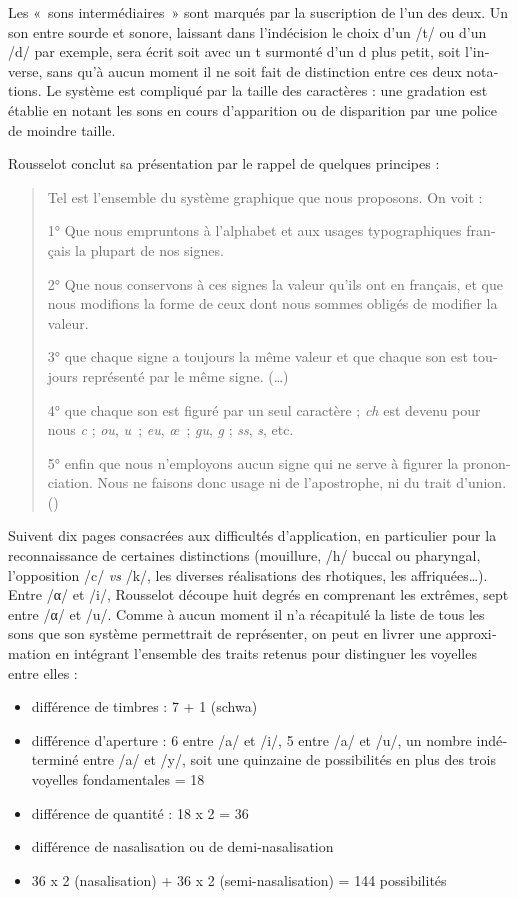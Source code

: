 \documentclass[french,output=paper,colorlinks,citecolor=brown]{../langscibook}
\begin{document}
\begin{otherlanguage}{french}
Les «~sons intermédiaires~» sont marqués par la suscription de l’un des deux. Un son entre sourde et sonore, laissant dans l’indécision le choix d’un /t/ ou d’un /d/ par exemple, sera écrit soit avec un t surmonté d’un d plus petit, soit l’inverse, sans qu’à aucun moment il ne soit fait de distinction entre ces deux notations. Le système est compliqué par la taille des caractères : une gradation est établie en notant les sons en cours d’apparition ou de disparition par une police de moindre taille.

Rousselot conclut sa présentation par le rappel de quelques principes :

\begin{quote}
    Tel est l’ensemble du système graphique que nous proposons. On voit :

    1° Que nous empruntons à l’alphabet et aux usages typographiques français la plupart de nos signes.

    2° Que nous conservons à ces signes la valeur qu’ils ont en français, et que nous modifions la forme de ceux dont nous sommes obligés de modifier la valeur.

    3° que chaque signe a toujours la même valeur et que chaque son est toujours représenté par le même signe. (…)

    4° que chaque son est figuré par un seul caractère ; \textit{ch} est devenu pour nous \textit{c} ; \textit{ou}, \textit{u~}; \textit{eu}, \textit{œ~}; \textit{gu}, \textit{g} ; \textit{ss}, \textit{s}, etc.

    5° enfin que nous n’employons aucun signe qui ne serve à figurer la prononciation. Nous ne faisons donc usage ni de l’apostrophe, ni du trait d’union. (\citealt[6--7]{Rousselot1887})
\end{quote}

Suivent dix pages consacrées aux difficultés d’application, en particulier pour la reconnaissance de certaines distinctions (mouillure, /h/ buccal ou pharyngal, l’opposition /c/ \textit{vs} /k/, les diverses réalisations des rhotiques, les affriquées…). Entre /α/ et /i/, Rousselot découpe huit degrés en comprenant les extrêmes, sept entre /α/ et /u/. Comme à aucun moment il n’a récapitulé la liste de tous les sons que son système permettrait de représenter, on peut en livrer une approximation en intégrant l’ensemble des traits retenus pour distinguer les voyelles entre elles :

\begin{itemize}
    \item différence de timbres : 7 + 1 (schwa)
    \item différence d’aperture : 6 entre /a/ et /i/, 5 entre /a/ et /u/, un nombre indéterminé entre /a/ et /y/, soit une quinzaine de possibilités en plus des trois voyelles fondamentales = 18
    \item différence de quantité : 18 x 2 = 36
    \item différence de nasalisation ou de demi-nasalisation
    \item 36 x 2 (nasalisation) + 36 x 2 (semi-nasalisation) = 144 possibilités
\end{itemize}


\end{otherlanguage}
\end{document}
